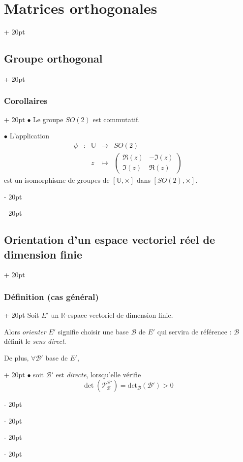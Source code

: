 \documentclass[a4paper, 12pt, twoside]{article}
\newcommand{\R}{\mathbb{R}} %
\newcommand{\U}{\mathbb{U}} %
\newcommand{\lr}[1]{\left( #1 \right)}
\newcommand{\ind}[1][20pt]{\advance\leftskip + #1}
\newcommand{\deind}[1][20pt]{\advance\leftskip - #1}
\newenvironment{indt}[2][20pt]{#2 \par \ind[#1]}{\par \deind} %
\begin{document}
\begin{indt}{\section{Matrices orthogonales}}
\begin{indt}{\subsection{Groupe orthogonal}}
            \begin{indt}{\subsubsection{Corollaires}}
                $\bullet$ Le groupe $SO(2)$ est commutatif.

                \vspace{12pt}
                
                $\bullet$ L'application
                \[
                    \begin{array}{ccccl}
                        \psi & : & \U & \longrightarrow & SO(2)
                        \\
                         && z & \longmapsto &
                         \begin{pmatrix}
                             \Re(z) & -\Im(z)
                             \\
                             \Im(z) & \Re(z)
                         \end{pmatrix}
                    \end{array}
                \]
                est un isomorphisme de groupes de $[\U, \times]$ dans $[SO(2), \times]$.
            \end{indt}
        \end{indt}

        \vspace{12pt}
        
        \begin{indt}{\subsection{Orientation d'un espace vectoriel réel de dimension finie}}
            \begin{indt}{\subsubsection{Définition (cas général)}}
                Soit $E'$ un $\R$-espace vectoriel de dimension finie.

                Alors \emph{orienter} $E'$ signifie choisir une base $\mathcal B$ de $E'$ qui servira de référence : $\mathcal B$ définit le \emph{sens direct}.

                \begin{indt}{De plus, $\forall \mathcal B'$ base de $E'$,}
                    $\bullet$ soit $\mathcal B'$ est \emph{directe}, lorsqu'elle vérifie
                    \[
                        \det\!\lr{\mathcal P_{\mathcal B}^{\mathcal B'}} = \mathrm{det}_{\mathcal B}(\mathcal B') > 0
                    \]


\end{indt}
\end{indt}
\end{indt}
\end{indt}
\end{document}

